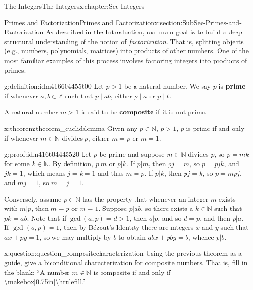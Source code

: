 \documentclass[oneside,10pt,]{book}
\newcommand{\terminology}[1]{\textbf{#1}}
\numberwithin{equation}{section}
\def\Z{{\mathbb Z}}
\def\N{{\mathbb N}}
\begin{document}
\begin{chapterptx}{The Integers}{}{The Integers}{}{}{x:chapter:Sec-Integers}
\typeout{************************************************}
%
\begin{sectionptx}{Primes and Factorization}{}{Primes and Factorization}{}{}{x:section:SubSec-Primes-and-Factorization}
As described in the Introduction, our main goal is to build a deep structural understanding of the notion of \emph{factorization}. That is, splitting objects (e.g., numbers, polynomials, matrices) into products of other numbers. One of the most familiar examples of this process involves factoring integers into products of primes.%
\begin{definition}{}{g:definition:idm416604455600}%
Let \(p > 1\) be a natural number. We say \(p\) is \terminology{prime} if whenever \(a,b\in \Z\) such that \(p\mid ab\), either \(p\mid a\) or \(p\mid b\).%
\par
A natural number \(m > 1\) is said to be \terminology{composite} if it is not prime.%
\end{definition}
\begin{theorem}{}{}{x:theorem:theorem_euclidslemma}%
Given any \(p\in \N\), \(p > 1\), \(p\) is prime if and only if whenever \(m\in \N\) divides \(p\), either \(m = p\) or \(m = 1\).%
\end{theorem}
\begin{proofptx}{}{g:proof:idm416604445520}
Let \(p\) be prime and suppose \(m\in \N\) divides \(p\), so \(p = mk\) for some \(k\in \N\). By definition, \(p|m\) or \(p|k\). If \(p|m\), then \(pj = m\), so \(p = pjk\), and \(jk=1\), which means \(j=k=1\) and thus \(m=p\). If \(p|k\), then \(pj=k\), so \(p = mpj\), and \(mj=1\), so \(m = j = 1\).%
\par
Conversely, assume \(p\in \N\) has the property that whenever an integer \(m\) exists with \(m|p\), then \(m= p\) or \(m =1\). Suppose \(p|ab\), so there exists a \(k\in\N\) such that \(pk = ab\). Note that if \(\gcd(a,p) = d > 1\), then \(d|p\), and so \(d = p\), and then \(p|a\). If \(\gcd(a,p) = 1\), then by Bézout's Identity there are integers \(x\) and \(y\) such that \(ax + py = 1\), so we may multiply by \(b\) to obtain \(abx + pby = b\), whence \(p|b\).%
\end{proofptx}
\begin{question}{}{x:question:question_compositecharacterization}%
Using the previous theorem as a guide, give a biconditional characterization for composite numbers. That is, fill in the blank: ``A number \(m\in\N\) is composite if and only if \textbackslash{}makebox[0.75in]\textbraceleft{}\textbackslash{}hrulefill\textbraceright{}.''%

\end{question}
\end{sectionptx}
\end{chapterptx}
\end{document}
